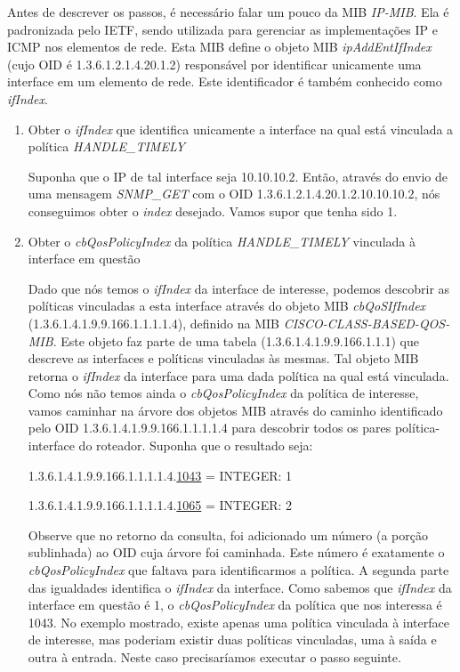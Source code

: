 	Antes de descrever os passos, é necessário falar um pouco da MIB \textit{IP-MIB}. Ela é padronizada pelo IETF, sendo utilizada para gerenciar as implementações IP e ICMP nos elementos de rede. Esta MIB define o objeto MIB \textit{ipAddEntIfIndex} (cujo OID é 1.3.6.1.2.1.4.20.1.2) responsável por identificar unicamente uma interface em um elemento de rede. Este identificador é também conhecido como \textit{ifIndex}.
	
\begin{enumerate}

\item Obter o \textit{ifIndex} que identifica unicamente a interface na qual está vinculada a política \textit{HANDLE\_TIMELY}

Suponha que o IP de tal interface seja 10.10.10.2. Então, através do envio de uma mensagem \textit{SNMP\_GET} com o OID 1.3.6.1.2.1.4.20.1.2.10.10.10.2, nós conseguimos obter o \textit{index} desejado. Vamos supor que tenha sido 1.

\item Obter o \textit{cbQosPolicyIndex} da política \textit{HANDLE\_TIMELY} vinculada à interface em questão

Dado que nós temos o \textit{ifIndex} da interface de interesse, podemos descobrir as políticas vinculadas a esta interface através do objeto MIB \textit{cbQoSIfIndex} (1.3.6.1.4.1.9.9.166.1.1.1.1.4), definido na MIB \textit{CISCO-CLASS-BASED-QOS-MIB}. Este objeto faz parte de uma tabela (1.3.6.1.4.1.9.9.166.1.1.1) que descreve as interfaces e políticas vinculadas às mesmas. Tal objeto MIB retorna o \textit{ifIndex} da interface para uma dada política na qual está vinculada. Como nós não temos ainda o \textit{cbQosPolicyIndex} da política de interesse, vamos caminhar na árvore dos objetos MIB através do caminho identificado pelo OID 1.3.6.1.4.1.9.9.166.1.1.1.1.4 para descobrir todos os pares política-interface do roteador. Suponha que o resultado seja:

1.3.6.1.4.1.9.9.166.1.1.1.1.4.\underline{1043} = INTEGER: 1

1.3.6.1.4.1.9.9.166.1.1.1.1.4.\underline{1065} = INTEGER: 2

Observe que no retorno da consulta, foi adicionado um número (a porção sublinhada) ao OID cuja árvore foi caminhada. Este número é exatamente o \textit{cbQosPolicyIndex} que faltava para identificarmos a política. A segunda parte das igualdades identifica o \textit{ifIndex} da interface. Como sabemos que \textit{ifIndex} da interface em questão é 1, o \textit{cbQosPolicyIndex} da política que nos interessa é 1043. No exemplo mostrado, existe apenas uma política vinculada à interface de interesse, mas poderiam existir duas políticas vinculadas, uma à saída e outra à entrada. Neste caso precisaríamos executar o passo seguinte.


\end{enumerate}
